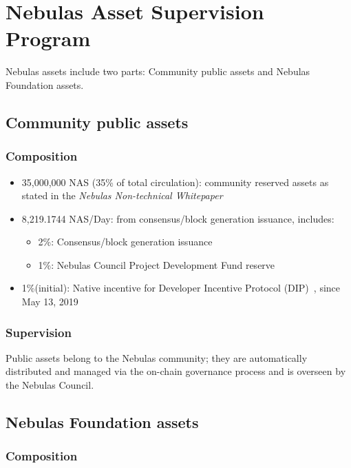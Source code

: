 \section{Nebulas Asset Supervision Program}

Nebulas assets include two parts: Community public assets and Nebulas Foundation assets.

\subsection{Community public assets}

\subsubsection{Composition}

\begin{itemize}
	\item 35,000,000 NAS (35\% of total circulation): community reserved assets as stated in the \textit{Nebulas Non-technical Whitepaper}
    \item 8,219.1744 NAS/Day: from consensus/block generation issuance, includes:
	    \begin{itemize}
			\item 2\%: Consensus/block generation issuance
			\item 1\%: Nebulas Council Project Development Fund reserve
		\end{itemize}
	\item 1\%(initial): Native incentive for Developer Incentive Protocol (DIP)~\cite{mauvepaper}, since May 13, 2019
\end{itemize}

\subsubsection{Supervision}

Public assets belong to the Nebulas community; they are automatically distributed and managed via the on-chain governance process and is overseen by the Nebulas Council.

\subsection{Nebulas Foundation assets}

\subsubsection{Composition}

